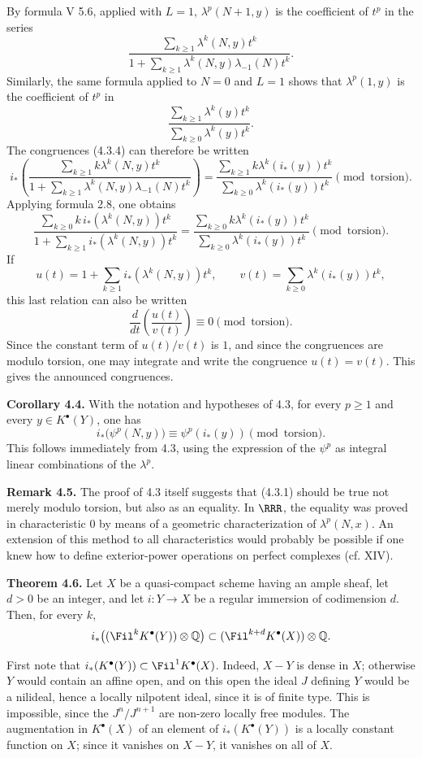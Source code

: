 By formula V 5.6, applied with \(L=1\), \(\lambda^p(N+1,y)\) is the coefficient of \(t^p\) in the series
\[
  \frac{\sum_{k\ge1}\lambda^k(N,y)t^k}
       {1+\sum_{k\ge1}\lambda^k(N,y)\lambda_{-1}(N)t^k}.
\]
Similarly, the same formula applied to \(N=0\) and \(L=1\) shows that \(\lambda^p(1,y)\) is the coefficient of \(t^p\) in
\[
  \frac{\sum_{k\ge1}\lambda^k(y)t^k}
       {\sum_{k\ge0}\lambda^k(y)t^k}.
\]
The congruences (4.3.4) can therefore be written
\[
i_*\left(
  \frac{\sum_{k\ge1}k\lambda^k(N,y)t^k}
       {1+\sum_{k\ge1}\lambda^k(N,y)\lambda_{-1}(N)t^k}
\right)
=
  \frac{\sum_{k\ge1}k\lambda^k(i_*(y))t^k}
       {\sum_{k\ge0}\lambda^k(i_*(y))t^k}
       \pmod{\text{torsion}}.
\]
Applying formula 2.8, one obtains
\[
  \frac{\sum_{k\ge0}k\,i_*(\lambda^k(N,y))t^k}
       {1+\sum_{k\ge1} i_*(\lambda^k(N,y))t^k}
  =
  \frac{\sum_{k\ge0}k\lambda^k(i_*(y))t^k}
       {\sum_{k\ge0}\lambda^k(i_*(y))t^k}
       \pmod{\text{torsion}}.
\]
If
\[
  u(t)=1+\sum_{k\ge1}i_*(\lambda^k(N,y))t^k,\qquad
  v(t)=\sum_{k\ge0}\lambda^k(i_*(y))t^k,
\]
this last relation can also be written
\[
  \frac{d}{dt}\!\left(\frac{u(t)}{v(t)}\right)\equiv0
  \pmod{\text{torsion}}.
\]
Since the constant term of \(u(t)/v(t)\) is \(1\), and since the congruences are modulo torsion, one may integrate and write the congruence \(u(t)=v(t)\). This gives the announced congruences.

\textbf{Corollary 4.4.} With the notation and hypotheses of 4.3, for every \(p\ge1\) and every \(y\in K^\bullet(Y)\), one has
\[
  i_*\bigl(\psi^p(N,y)\bigr)\equiv \psi^p(i_*(y))
  \pmod{\text{torsion}}.
\]
This follows immediately from 4.3, using the expression of the \(\psi^p\) as integral linear combinations of the \(\lambda^p\).

\textbf{Remark 4.5.} The proof of 4.3 itself suggests that (4.3.1) should be true not merely modulo torsion, but also as an equality. In \(\RRR\), the equality was proved in characteristic \(0\) by means of a geometric characterization of \(\lambda^p(N,x)\). An extension of this method to all characteristics would probably be possible if one knew how to define exterior-power operations on perfect complexes (cf. XIV).

\textbf{Theorem 4.6.} Let \(X\) be a quasi-compact scheme having an ample sheaf, let \(d>0\) be an integer, and let \(i:Y\to X\) be a regular immersion of codimension \(d\). Then, for every \(k\),
\[
 i_*\bigl((\Fil^kK^\bullet(Y))\otimes\mathbb Q\bigr)
 \subset
 (\Fil^{k+d}K^\bullet(X))\otimes\mathbb Q.
\]

First note that \(i_*(K^\bullet(Y))\subset \Fil^1K^\bullet(X)\). Indeed, \(X-Y\) is dense in \(X\); otherwise \(Y\) would contain an affine open, and on this open the ideal \(J\) defining \(Y\) would be a nilideal, hence a locally nilpotent ideal, since it is of finite type. This is impossible, since the \(J^n/J^{n+1}\) are non-zero locally free modules. The augmentation in \(K^\bullet(X)\) of an element of \(i_*(K^\bullet(Y))\) is a locally constant function on \(X\); since it vanishes on \(X-Y\), it vanishes on all of \(X\).

